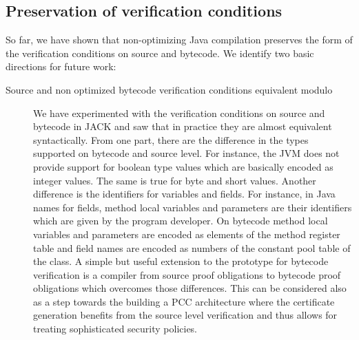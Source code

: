  
\subsection{Preservation of verification conditions}

So far, we have shown that non-optimizing Java compilation
 preserves the  form of the verification conditions on source and
 bytecode.  We identify two basic directions for future work:
\begin{description}
 \item[Source and non optimized bytecode verification conditions equivalent modulo] %
We have experimented with the verification conditions on source and
 bytecode in JACK and saw that in practice they are almost equivalent
 syntactically. From one part, there are the difference in the types 
 supported on bytecode and source level. For instance, the JVM does not
 provide support for boolean type values which are basically encoded as
 integer values. The same is true for byte and short values.  Another
 difference is the identifiers for variables and fields. For instance, in Java
 names for fields, method local variables and parameters are their identifiers which are given by the
 program developer. On bytecode method local variables and parameters are encoded as elements of the
 method register table and field names are encoded as numbers of the constant
 pool table of the class. A  simple but useful extension to the prototype for
 bytecode verification is a compiler from source proof obligations to bytecode proof obligations
 which overcomes those differences. This can be considered also as a step
 towards the  building a PCC architecture where the certificate generation benefits from
 the source level verification and thus allows for treating sophisticated
 security policies.


\end{description}
